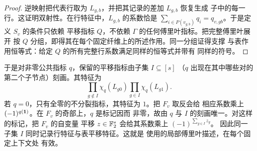 \begin{proof}
逆映射把代表行取为 $L_{g,b}$，并把其记录的差加 $L_{g,b}$ 恢复生成
子中的每一行。这证明双射性。在行特征中，$L_{g,b}$ 的系数恰是
$\sum_{i\in P(v_{g,b})}q_i=q_{v,g b}$。于是定义 $S_v$ 的条件只依赖
平移指标 $Q$，不依赖 $\Gamma$ 的任何傅里叶指标。把完整傅里叶展开
按 $Q$ 分组，即得其在每个固定纤维上的所述作用。同一分组证得支撑
与表作用恒等式：给定 $Q$ 的所有完整行系数满足同样的恒等式并带有
同样的符号。
\end{proof}

于是对非零公共指标 $q$，保留的平移指标由子集 $I\subseteq[s]$
（$q$ 出现在其中哪些对的第二个子节点）刻画。其特征为
\[
 \prod_{g\notin I}\chi_q(L_{g0})
 \prod_{g\in I}\chi_q(L_{g1}).
\]
若 $q=0$，只有全零的不分裂指标，其特征为 $1$。把 $F_v$ 取反会给
相应系数乘上 $(-1)^{q(\mathbf 1)}$。在 $F_v$ 的奇部上，$q$ 是标记因而
非零，故由 $q$ 与 $I$ 的刻画唯一。对这样的标记，把 $F_v$ 的自变量
平移 $z\in\mathbb F_2^s$ 会给其系数乘上 $(-1)^{\sum_{g\in I}z_g}$。
因此同一子集 $I$ 同时记录行特征与表平移特征。这就是
 使用的局部傅里叶描述，在每个固定上下文处
有效。
